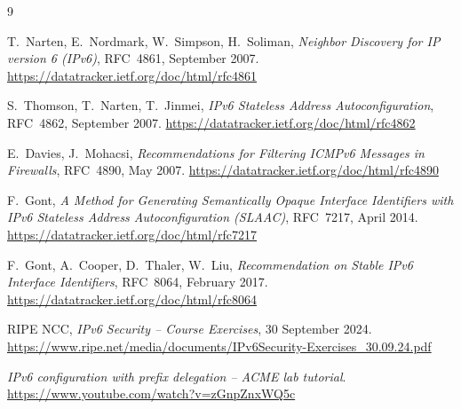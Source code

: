 \documentclass[twocolumn]{NobArticle}
\begin{document}
\newpage
\begin{thebibliography}{9}

T.~Narten, E.~Nordmark, W.~Simpson, H.~Soliman,
\textit{Neighbor Discovery for IP version 6 (IPv6)},
RFC~4861, September 2007.
\url{https://datatracker.ietf.org/doc/html/rfc4861}

S.~Thomson, T.~Narten, T.~Jinmei,
\textit{IPv6 Stateless Address Autoconfiguration},
RFC~4862, September 2007.
\url{https://datatracker.ietf.org/doc/html/rfc4862}

E.~Davies, J.~Mohacsi,
\textit{Recommendations for Filtering ICMPv6 Messages in Firewalls},
RFC~4890, May 2007.
\url{https://datatracker.ietf.org/doc/html/rfc4890}

F.~Gont,
\textit{A Method for Generating Semantically Opaque Interface Identifiers
with IPv6 Stateless Address Autoconfiguration (SLAAC)},
RFC~7217, April 2014.
\url{https://datatracker.ietf.org/doc/html/rfc7217}

F.~Gont, A.~Cooper, D.~Thaler, W.~Liu,
\textit{Recommendation on Stable IPv6 Interface Identifiers},
RFC~8064, February 2017.
\url{https://datatracker.ietf.org/doc/html/rfc8064}

RIPE NCC,
\textit{IPv6 Security -- Course Exercises}, 30 September 2024.
\url{https://www.ripe.net/media/documents/IPv6Security-Exercises_30.09.24.pdf}

\textit{IPv6 configuration with prefix delegation -- ACME lab tutorial}.
\url{https://www.youtube.com/watch?v=zGnpZnxWQ5c}

\end{thebibliography}
\end{document}
